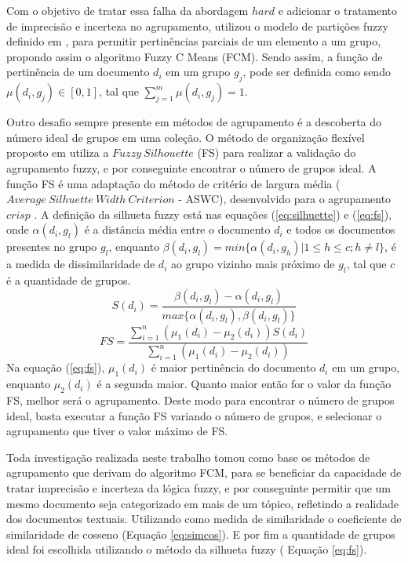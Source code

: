 Com o objetivo de tratar essa falha da abordagem $hard$ e adicionar o tratamento de imprecisão 
e incerteza no agrupamento,
\cite{Bezdek1984} utilizou o modelo de partições fuzzy definido em \cite{Zadeh1965}, para permitir
pertinências parciais de um elemento a um grupo, propondo assim o algoritmo Fuzzy C Means (FCM). 
Sendo assim, a função de pertinência de um documento $d_{i}$ em um grupo $g_{j}$, pode ser definida como sendo $\mu(d_{i}, g_{j}) \in [0,1]$, 
tal que $\sum_{j=1}^m \mu(d_{i}, g_{j}) = 1$.

Outro desafio sempre presente em métodos de agrupamento é a descoberta do número ideal de grupos
em uma coleção. O método de organização flexível proposto em \cite{Nogueira2013} 
utiliza a  $Fuzzy\ Silhouette$ (FS) para realizar a validação do agrupamento fuzzy, e por conseguinte
encontrar o número de grupos ideal. A função FS é uma adaptação do método de critério de largura 
média ($Average\ Silhuette\ Width\ Criterion$ - ASWC), desenvolvido para o agrupamento $crisp$
\cite{Nogueira2013}. A definição da silhueta fuzzy 
está nas equações (\ref{eq:silhuette}) e (\ref{eq:fs}), onde $\alpha(d_i, g_l)$ é a distância 
média entre o documento $d_i$ e todos os documentos 
presentes no grupo $g_l$, enquanto 
$\beta(d_i,g_l) = min\{\alpha(d_i,g_h) | 1 \leq h \leq c; h \neq l\}$, é a 
medida de dissimilaridade de $d_i$ ao grupo vizinho mais próximo de $g_l$, tal que $c$ é a 
quantidade de grupos.
\begin{equation}
  S(d_i) = \frac{\beta(d_i, g_l) - \alpha(d_i,g_l)}{max\{\alpha(d_i,g_l), \beta(d_i,g_l)\}}
  \label{eq:silhuette}
\end{equation}
\begin{equation}
  FS = \frac{\sum_{i=1}^n{(\mu_1(d_i) - \mu_2(d_i))}S(d_i)}{\sum_{i=1}^n{(\mu_1(d_i) - \mu_2(d_i))}}
  \label{eq:fs}
\end{equation}
Na equação (\ref{eq:fs}), $\mu_1(d_i)$ é maior pertinência do documento $d_i$ em um grupo, enquanto 
$\mu_2(d_i)$ é a segunda maior. Quanto maior então for o valor da função FS, melhor será o 
agrupamento. Deste modo para encontrar o número de grupos ideal, basta executar a função FS 
variando o número de grupos, e selecionar o agrupamento que tiver o valor máximo de FS.

Toda investigação realizada neste trabalho tomou como base os métodos de agrupamento que 
derivam do algoritmo FCM\cite{Bezdek1984}, para se beneficiar da capacidade de tratar imprecisão e 
incerteza da lógica fuzzy, e por conseguinte permitir que um mesmo documento seja categorizado 
em mais de um tópico, refletindo a realidade dos documentos textuais. Utilizando como medida
de similaridade o coeficiente de similaridade de cosseno (Equação \ref{eq:simcos}). E por fim a quantidade
de grupos ideal foi escolhida utilizando o método da silhueta fuzzy ( Equação \ref{eq:fs}).

